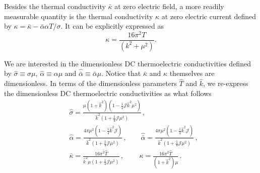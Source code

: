 \documentclass[preprint,onecolumn,nofootinbib]{revtex4}
\begin{document}
Besides the thermal conductivity $\bar \kappa$ at zero electric field, a more readily measurable quantity is the thermal conductivity $\kappa$ at zero electric current defined by $\kappa=\bar \kappa-\bar \alpha \alpha T/\sigma$. It can be explicitly expressed as
\begin{equation}
	\kappa  = \frac{{16{\pi ^2}T}}{{\left( {{k^2} + {\mu ^2}} \right)}}.
	\label{kappav0}
\end{equation}

We are interested in the dimensionless DC thermoelectric conductivities defined by $\hat{\sigma}\equiv\sigma\mu$, $\hat{\alpha}\equiv\alpha\mu$ and $\hat{\bar{\alpha}}\equiv\bar{\alpha}\mu$. Notice that $\bar{\kappa}$ and $\kappa$ themselves are dimensionless. In terms of the dimensionless parameters $\hat{T}$ and $\hat{k}$, we re-express the dimensionless DC thermoelectric conductivities as what follows
\begin{align}
	&\hat \sigma=\frac{{\mu ( {1 + {{\hat k}^2}} )\left( {1 - \frac{1}{4}\mathcal{J}{{\hat k}^2}{\mu ^2}} \right)}}{{{{\hat k}^2}( {1 + \frac{1}{4}\mathcal{J}{\mu ^2}} )}}\,,\nonumber\\
	&\hat{\alpha}=   \frac{{4\pi {\mu ^2}( {1 - \frac{1}{4}{{\hat k}^2}\mathcal{J}} )}}{{{{\hat k}^2}( {1 + \frac{1}{4}\mathcal{J}{\mu ^2}} )}}\,,\,\,\,\,\,\,\,\,\,\,\,\,
	\hat{\bar \alpha}= \frac{{4\pi {\mu ^2}( {1 - \frac{1}{4}{{\hat k}^2}\mathcal{J}} )}}{{{{\hat k}^2}( {1 + \frac{1}{4}\mathcal{J}{\mu ^2}} )}}\,,\nonumber\\
	&\bar{\kappa}= \frac{{16{\pi ^2}\hat T}}{{{{\hat k}^2}\mu \left( {1 + \frac{1}{4}\mathcal{J}{\mu ^2}} \right)}}\,,\,\,\,\,\,\,\,\,\,\,\,\,\,
	\kappa=\frac{{16{\pi ^2}\hat T}}{{( {1 + {{\hat k}^2}} )\mu }}\,.
	\label{kappa}
\end{align}
\end{document}

